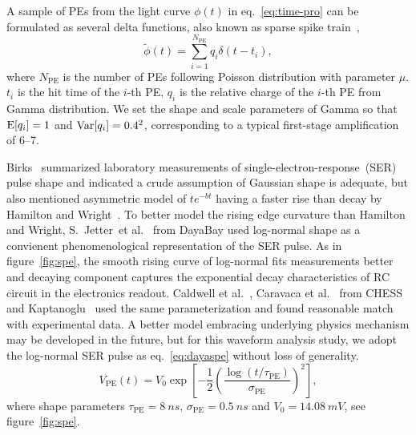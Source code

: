 A sample of PEs from the light curve $\phi(t)$ in eq.~\eqref{eq:time-pro} can be formulated as several delta functions, also known as sparse spike train~\cite{levy_reconstruction_1981}, 
\begin{equation}
  \label{eq:lc-sample}
  \tilde{\phi}(t) = \sum_{i=1}^{N_{\mathrm{PE}}} q_i \delta(t-t_i),
\end{equation}
where $N_\mathrm{PE}$ is the number of PEs following Poisson distribution with parameter $\mu$.  $t_i$ is the hit time of the $i$-th PE, $q_i$ is the relative charge of the $i$-th PE from Gamma distribution.  We set the shape and scale parameters of Gamma so that $\operatorname{E}[q_i] = 1$ and $\operatorname{Var}[q_i] = 0.4^2$, corresponding to a typical first-stage amplification of 6--7.

Birks~\cite{birks_theory_1967} summarized laboratory measurements of single-electron-response~(SER) pulse shape and indicated a crude assumption of Gaussian shape is adequate, but also mentioned asymmetric model of $t e^{-bt}$ having a faster rise than decay by Hamilton and Wright~\cite{hamilton_transit_1956}.  To better model the rising edge curvature than Hamilton and Wright, S.~Jetter~et al.~\cite{jetter_pmt_2012} from DayaBay used log-normal shape as a convienent phenomenological representation of the SER pulse.  As in figure~\ref{fig:spe}, the smooth rising curve of log-normal fits measurements better and decaying component captures the exponential decay characteristics of RC circuit in the electronics readout.  Caldwell et al.~\cite{caldwell_characterization_2013}, Caravaca et al.~\cite{caravaca_experiment_2017} from CHESS and Kaptanoglu~\cite{kaptanoglu_characterization_2018} used the same parameterization and found reasonable match with experimental data.  A better model embracing underlying physics mechanism may be developed in the future, but for this waveform analysis study, we adopt the log-normal SER pulse as eq.~\eqref{eq:dayaspe} without loss of generality.
\begin{equation}
  V_\mathrm{PE}(t) = V_{0}\exp\left[-\frac{1}{2}\left(\frac{\log(t/\tau_\mathrm{PE})}{\sigma_\mathrm{PE}}\right)^{2}\right],
  \label{eq:dayaspe}
\end{equation}
where shape parameters $\tau_\mathrm{PE}=\SI{8}{ns}$, $\sigma_\mathrm{PE}=\SI{0.5}{ns}$ and $V_{0}=\SI{14.08}{mV}$, see figure~\ref{fig:spe}.


